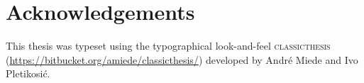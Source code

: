 
\begingroup
\let\clearpage\relax
\let\cleardoublepage\relax
\chapter*{Acknowledgements}
This thesis was typeset using the typographical look-and-feel \textsc{classicthesis} (\url{https://bitbucket.org/amiede/classicthesis/}) developed by Andr\'e Miede and Ivo Pletikosi\'c.

\endgroup
